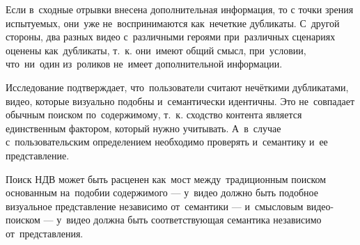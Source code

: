 \documentclass{.local/lib/classes/ndvr-super-article-standalone}
\begin{document}
    Если в~сходные отрывки внесена дополнительная информация,
    то с точки зрения испытуемых, 
    они~уже не~воспринимаются как~нечеткие дубликаты.
    С~другой стороны, два разных видео с~различными героями
    при~различных сценариях оценены как~дубликаты, т.~к. они~имеют общий смысл,
    при~условии, что~ни~один из~роликов не~имеет дополнительной информации.

    Исследование подтверждает, что~пользователи считают 
    нечёткими дубликатами,
    видео, которые визуально подобны и~семантически идентичны.
    Это не~совпадает обычным поиском по~содержимому,
    т.~к. сходство контента является 
    единственным фактором, который нужно учитывать.
    А~в~случае с~пользовательским определением необходимо проверять
    и~семантику и~ее представление.

    Поиск НДВ может быть расценен как~мост
    между~традиционным поиском основанным на~подобии содержимого
    — у~видео должно быть подобное визуальное
    представление независимо от~семантики —
    и~смысловым видео-поиском
    — у~видео должна быть соответствующая
    семантика независимо от~представления.







\end{document}
